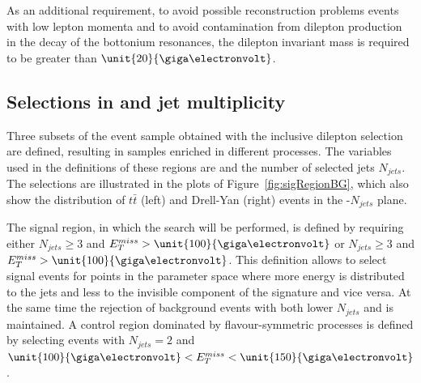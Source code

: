 As an additional requirement, to avoid possible reconstruction problems events with low lepton momenta and to avoid contamination from dilepton production in the decay of the bottonium resonances, the dilepton invariant mass \mll is required to be greater than $\unit{20}{\giga\electronvolt}$. 


\subsection{Selections in \MET and jet multiplicity}
Three subsets of the event sample obtained with the inclusive dilepton selection are defined, resulting in samples enriched in different processes. The variables used in the definitions of these regions are \MET and the number of selected jets $N_{jets}$. The selections are illustrated in the plots of Figure~\ref{fig:sigRegionBG}, which also show the distribution of $t\bar{t}$ (left) and Drell-Yan (right) events in the \MET-$N_{jets}$ plane. 
 
The signal region, in which the search will be performed, is defined by requiring either $N_{jets} \geq 3$ and $\MET > \unit{100}{\giga\electronvolt}$ or $N_{jets} \geq 3$ and $\MET > \unit{100}{\giga\electronvolt}$. This definition allows to select signal events for points in the parameter space where more energy is distributed to the jets and less to the invisible component of the signature and vice versa. At the same time the rejection of background events with both lower $N_{jets}$ and \MET is maintained. A control region dominated by flavour-symmetric processes is defined by selecting events with $N_{jets} = 2$ and $\unit{100}{\giga\electronvolt} < \MET < \unit{150}{\giga\electronvolt}$. 

